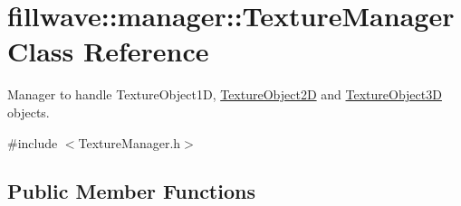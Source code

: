 \hypertarget{classfillwave_1_1manager_1_1TextureManager}{}\section{fillwave\+:\+:manager\+:\+:Texture\+Manager Class Reference}
\label{classfillwave_1_1manager_1_1TextureManager}


Manager to handle Texture\+Object1\+D, \hyperlink{classfillwave_1_1manager_1_1TextureObject2D}{Texture\+Object2\+D} and \hyperlink{classfillwave_1_1manager_1_1TextureObject3D}{Texture\+Object3\+D} objects.  




{\ttfamily \#include $<$Texture\+Manager.\+h$>$}

\subsection*{Public Member Functions}
